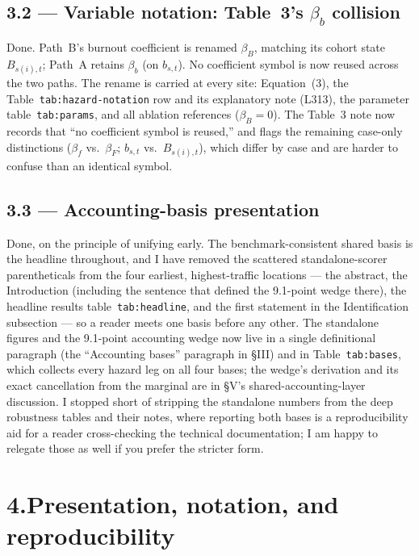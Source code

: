 \documentclass[11pt]{article}
\newcommand{\mlabel}[1]{\texttt{#1}}
\begin{document}
\subsection*{3.2 --- Variable notation: Table~3's $\beta_b$ collision}

Done. Path~B's burnout coefficient is renamed $\beta_B$, matching its cohort
state $B_{s(i),t}$; Path~A retains $\beta_b$ (on $b_{s,t}$). No coefficient
symbol is now reused across the two paths. The rename is carried at every site:
Equation~(3), the Table~\mlabel{tab:hazard-notation} row and its explanatory
note (L313), the parameter table~\mlabel{tab:params}, and all ablation
references ($\beta_B = 0$). The Table~3 note now records that ``no coefficient
symbol is reused,'' and flags the remaining case-only distinctions ($\beta_f$
vs.\ $\beta_F$; $b_{s,t}$ vs.\ $B_{s(i),t}$), which differ by case and are
harder to confuse than an identical symbol.

\subsection*{3.3 --- Accounting-basis presentation}

Done, on the principle of unifying early. The benchmark-consistent shared basis
is the headline throughout, and I have removed the scattered standalone-scorer
parentheticals from the four earliest, highest-traffic locations --- the
abstract, the Introduction (including the sentence that defined the 9.1-point
wedge there), the headline results table~\mlabel{tab:headline}, and the first
statement in the Identification subsection --- so a reader meets one basis
before any other. The standalone figures and the 9.1-point accounting wedge now
live in a single definitional paragraph (the ``Accounting bases'' paragraph in
\S III) and in Table~\mlabel{tab:bases}, which collects every hazard leg on all
four bases; the wedge's derivation and its exact cancellation from the marginal
are in \S V's shared-accounting-layer discussion. I stopped short of stripping
the standalone numbers from the deep robustness tables and their notes, where
reporting both bases is a reproducibility aid for a reader cross-checking the
technical documentation; I am happy to relegate those as well if you prefer the
stricter form.

\section*{4.\quad Presentation, notation, and reproducibility}
\end{document}
